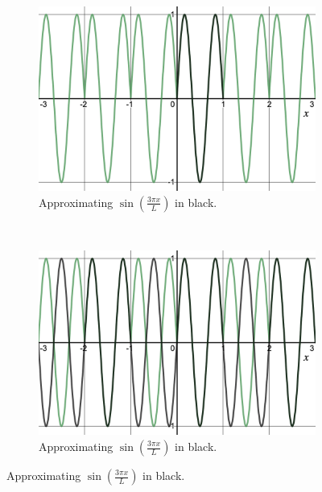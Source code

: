\documentclass[12pt]{article} %
\begin{document}
\begin{solution}
\begin{enumerate}[(a)]
	\begin{figure}[H]
				\centering
				\begin{subfigure}[h]{0.4\textwidth}
					\includegraphics[width=\textwidth]{Figures/sin3pi-series2.png}
					\caption{Approximating $\sin\left(\frac{3\pi x}{L}\right)$ in black.}
				\end{subfigure}
				~ 
				\begin{subfigure}[h]{0.4\textwidth}
					\includegraphics[width=\textwidth]{Figures/sin3pi-series1.png}
					\caption{Approximating $\sin\left(\frac{3\pi x}{L}\right)$ in black.}
				\end{subfigure}
			\end{figure}
		

\end{enumerate}
\end{solution}
\end{document}
